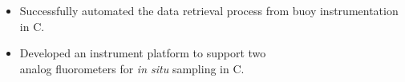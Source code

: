 \documentclass[11pt,twoside,a4paper]{article}
\begin{document}
{\begin{multicols}{2}
                \begin{itemize}[noitemsep,nolistsep]
                	\item Successfully automated the data retrieval process from buoy instrumentation in C. 
                	\item Developed an instrument platform to support two \\analog fluorometers for \textit{in situ} sampling in C. 
                \end{itemize}
                \vspace{5px}
        \end{multicols}
    }
\end{document}
